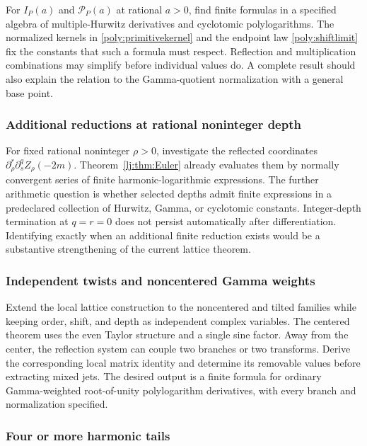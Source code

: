 For $I_P(a)$ and $\mathcal P_P(a)$ at rational $a>0$, find finite
formulas in a specified algebra of multiple-Hurwitz derivatives and
cyclotomic polylogarithms. The normalized kernels in
\eqref{poly:primitivekernel} and the endpoint law
\eqref{poly:shiftlimit} fix the constants that such a formula must
respect. Reflection and multiplication combinations may simplify before
individual values do. A complete result should also explain the relation
to the Gamma-quotient normalization with a general base point.

\subsubsection{Additional reductions at rational noninteger depth}

For fixed rational noninteger $\rho>0$, investigate the reflected
coordinates $\partial_\rho^r\partial_s^qZ_\rho(-2m)$.
Theorem~\ref{lj:thm:Euler} already evaluates them by normally convergent
series of finite harmonic-logarithmic expressions. The further
arithmetic question is whether selected depths admit finite expressions
in a predeclared collection of Hurwitz, Gamma, or cyclotomic constants.
Integer-depth termination at $q=r=0$ does not persist automatically
after differentiation. Identifying exactly when an additional finite
reduction exists would be a substantive strengthening of the current
lattice theorem.

\subsubsection{Independent twists and noncentered Gamma weights}

Extend the local lattice construction to the noncentered and tilted
families while keeping order, shift, and depth as independent complex
variables. The centered theorem uses the even Taylor structure and a
single sine factor. Away from the center, the reflection system can
couple two branches or two transforms. Derive the corresponding local
matrix identity and determine its removable values before extracting
mixed jets. The desired output is a finite formula for ordinary
Gamma-weighted root-of-unity polylogarithm derivatives, with every
branch and normalization specified.

\subsubsection{Four or more harmonic tails}

